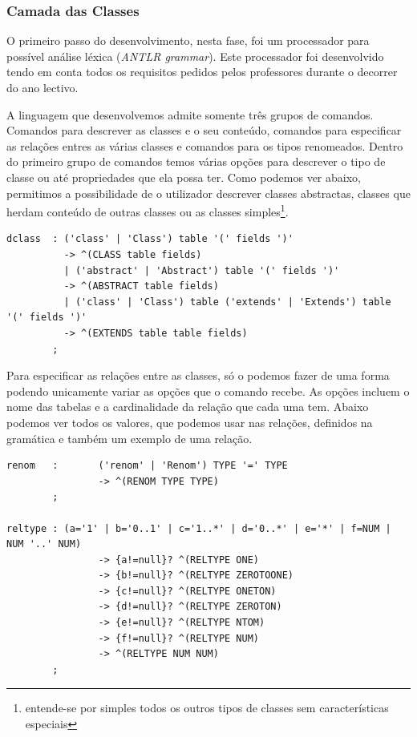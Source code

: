 \documentclass[a4paper]{article}
\begin{document}
\subsubsection{\large Camada das Classes}

\hspace{1cm}O primeiro passo do desenvolvimento, nesta fase, foi um processador para possível análise léxica ({\em ANTLR grammar}). Este processador foi desenvolvido tendo em conta todos os requisitos pedidos pelos professores durante o decorrer do ano lectivo.

\hspace{1cm}A linguagem que desenvolvemos admite somente três grupos de comandos. Comandos para descrever as classes e o seu conteúdo, comandos para especificar as relações entres as várias classes e comandos para os tipos renomeados. Dentro do primeiro grupo de comandos temos várias opções para descrever o tipo de classe ou até propriedades que ela possa ter. Como podemos ver abaixo, permitimos a possibilidade de o utilizador descrever classes abstractas, classes que herdam conteúdo de outras classes ou as classes simples\footnote{entende-se por simples todos os outros tipos de classes sem características especiais}.\\

\begin{small}
\begin{lstlisting}
dclass  : ('class' | 'Class') table '(' fields ')'
          -> ^(CLASS table fields)
          | ('abstract' | 'Abstract') table '(' fields ')'
          -> ^(ABSTRACT table fields)
          | ('class' | 'Class') table ('extends' | 'Extends') table '(' fields ')'
          -> ^(EXTENDS table table fields)
        ;
\end{lstlisting}
\end{small}

\hspace{1cm}Para especificar as relações entre as classes, só o podemos fazer de uma forma podendo unicamente variar as opções que o comando recebe. As opções incluem o nome das tabelas e a cardinalidade da relação que cada uma tem. Abaixo podemos ver todos os valores, que podemos usar nas relações, definidos na gramática e também um exemplo de uma relação.\\

\begin{small}
\begin{lstlisting}
renom   :       ('renom' | 'Renom') TYPE '=' TYPE
                -> ^(RENOM TYPE TYPE)
        ;

reltype : (a='1' | b='0..1' | c='1..*' | d='0..*' | e='*' | f=NUM | NUM '..' NUM)
                -> {a!=null}? ^(RELTYPE ONE)
                -> {b!=null}? ^(RELTYPE ZEROTOONE)
                -> {c!=null}? ^(RELTYPE ONETON)
                -> {d!=null}? ^(RELTYPE ZEROTON)
                -> {e!=null}? ^(RELTYPE NTOM)
                -> {f!=null}? ^(RELTYPE NUM)
                -> ^(RELTYPE NUM NUM)
        ;
\end{lstlisting}
\end{small}
\end{document}
